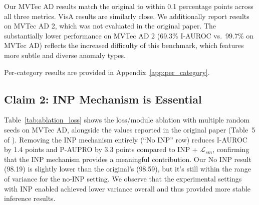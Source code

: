 \documentclass[10pt]{article} %
\begin{document}
Our MVTec AD results match the original to within 0.1 percentage points across all three metrics. VisA results are similarly close. We additionally report results on MVTec AD 2, which was not evaluated in the original paper. The substantially lower performance on MVTec AD 2 (69.3\% I-AUROC vs.\ 99.7\% on MVTec AD) reflects the increased difficulty of this benchmark, which features more subtle and diverse anomaly types.

Per-category results are provided in Appendix~\ref{app:per_category}.


\subsection{Claim 2: INP Mechanism is Essential}
\label{sec:results_inp}

Table~\ref{tab:ablation_loss} shows the loss/module ablation with multiple random seeds on MVTec AD, alongside the values reported in the original paper (Table~5 of \citealt{inp_former_2025}). Removing the INP mechanism entirely (``No INP'' row) reduces I-AUROC by 1.4 points and P-AUPRO by 3.3 points compared to INP + $\mathcal{L}_{sm}$, confirming that the INP mechanism provides a meaningful contribution. Our No INP result (98.19) is slightly lower than the original's (98.59), but it's still within the range of variance for the no-INP setting. We observe that the experimental settings with INP enabled achieved lower variance overall and thus provided more stable inference results.
\end{document}
